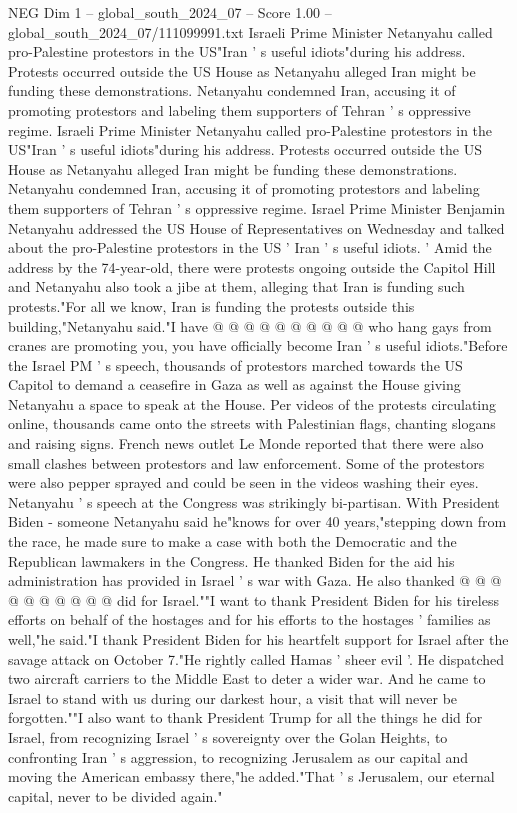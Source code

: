\begin{textsample}{NEG Dim 1 – global\_south\_2024\_07 – Score 1.00 – global\_south\_2024\_07/111099991.txt}  \label{ex:f1_neg_274}
Israeli Prime Minister Netanyahu called pro-Palestine protestors in the US"Iran ' s useful idiots"during his address.
Protests occurred outside the US House as Netanyahu alleged Iran might be funding these demonstrations.
Netanyahu condemned Iran, accusing it of promoting protestors and labeling them supporters of Tehran ' s oppressive regime.
Israeli Prime Minister Netanyahu called pro-Palestine protestors in the US"Iran ' s useful idiots"during his address.
Protests occurred outside the US House as Netanyahu alleged Iran might be funding these demonstrations.
Netanyahu condemned Iran, accusing it of promoting protestors and labeling them supporters of Tehran ' s oppressive regime.
Israel Prime Minister Benjamin Netanyahu addressed the US House of Representatives on Wednesday and talked about the pro-Palestine protestors in the US ' Iran ' s useful idiots. ' Amid the address by the 74-year-old, there were protests ongoing outside the Capitol Hill and Netanyahu also took a jibe at them, alleging that Iran is funding such protests."For all we know, Iran is funding the protests outside this building,"Netanyahu said."I have @ @ @ @ @ @ @ @ @ @ who hang gays from cranes are promoting you, you have officially become Iran ' s useful idiots."Before the Israel PM ' s speech, thousands of protestors marched towards the US Capitol to demand a ceasefire in Gaza as well as against the House giving Netanyahu a space to speak at the House.
Per videos of the protests circulating online, thousands came onto the streets with Palestinian flags, chanting slogans and raising signs.
French news outlet Le Monde reported that there were also small clashes between protestors and law enforcement.
Some of the protestors were also pepper sprayed and could be seen in the videos washing their eyes.
Netanyahu ' s speech at the Congress was strikingly bi-partisan.
With President Biden - someone Netanyahu said he"knows for over 40 years,"stepping down from the race, he made sure to make a case with both the Democratic and the Republican lawmakers in the Congress.
He thanked Biden for the aid his administration has provided in Israel ' s war with Gaza.
He also thanked @ @ @ @ @ @ @ @ @ @ did for Israel.""I want to thank President Biden for his tireless efforts on behalf of the hostages and for his efforts to the hostages ' families as well,"he said."I thank President Biden for his heartfelt support for Israel after the savage attack on October 7."He rightly called Hamas ' sheer evil '.
He dispatched two aircraft carriers to the Middle East to deter a wider war.
And he came to Israel to stand with us during our darkest hour, a visit that will never be forgotten.""I also want to thank President Trump for all the things he did for Israel, from recognizing Israel ' s sovereignty over the Golan Heights, to confronting Iran ' s aggression, to recognizing Jerusalem as our capital and moving the American embassy there,"he added."That ' s Jerusalem, our eternal capital, never to be divided again."

\end{textsample}
